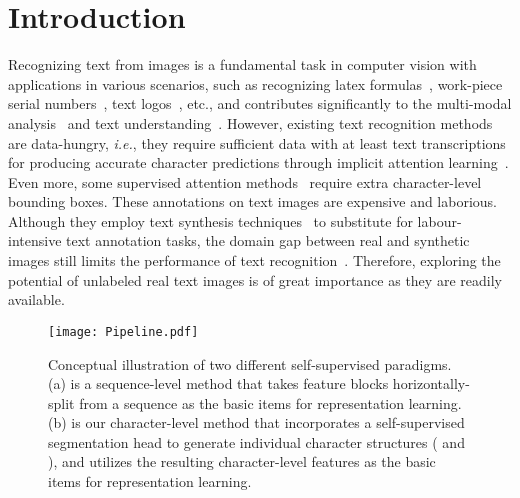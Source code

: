 \documentclass[10pt,twocolumn,letterpaper]{article}
\begin{document}
\section{Introduction}

Recognizing text from images is a fundamental task in computer vision with applications in various scenarios, such as recognizing latex formulas~\cite{Latex}, work-piece serial numbers~\cite{guan2021industrial}, text logos~\cite{Logo}, etc., and contributes significantly to the multi-modal analysis~\cite{multimodal} and text understanding~\cite{TAP,TextVQA}.
However, existing text recognition methods~\cite{wan2020textscanner,ABINET:fang2021read,DAN:wang2020decoupled,ConCLR,MGP,SATRN:lee2020recognizing,S_GTR} are data-hungry, \emph{i.e.}, they require sufficient data with at least text transcriptions for producing accurate character predictions through implicit attention learning~\cite{guan2022glyph}. Even more, some supervised attention methods~\cite{S_GTR,wan2020textscanner,liao2019scene} require extra character-level bounding boxes. These annotations on text images are expensive and laborious. Although they employ text synthesis techniques~\cite{ST:gupta2016synthetic,MJ:jaderberg2014synthetic} to substitute for labour-intensive text annotation tasks, the domain gap between real and synthetic images still limits the performance of text recognition~\cite{DiG}. Therefore, exploring the potential of unlabeled real text images is of great importance as they are readily available.

\begin{figure}[t]
  \centering
  \graphicspath{{./graph/}}
  \texttt{[image: Pipeline.pdf]}
  \caption{Conceptual illustration of two different self-supervised paradigms. 
  (a) is a sequence-level method that takes feature blocks horizontally-split from a sequence as the basic items for representation learning. (b) is our character-level method that incorporates a self-supervised segmentation head to generate individual character structures ( and ), and utilizes the resulting character-level features as the basic items for representation learning.
    }
  \label{Figs.overview}
  \vspace{-1.2em}
\end{figure}
\end{document}
